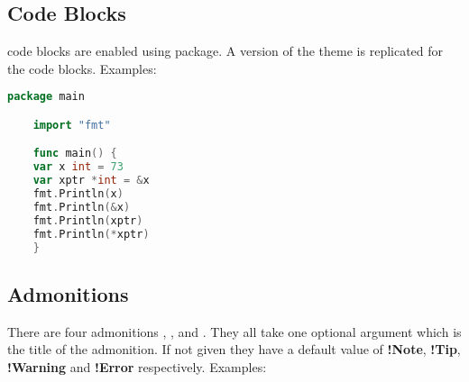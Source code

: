 \documentclass[12pt,a4paper]{report}
\begin{document}
\subsection{Code Blocks}
code blocks are enabled using  package. A version of the  theme is replicated for the code blocks. Examples:

\noindent
\begin{lstlisting}[language=go, caption={Code block caption},label=myCodeLabel]
	package main

	import "fmt"

	func main() {
	var x int = 73
	var xptr *int = &x
	fmt.Println(x)
	fmt.Println(&x)
	fmt.Println(xptr)
	fmt.Println(*xptr)
	}
\end{lstlisting}

\subsection{Admonitions}
There are four admonitions , ,  and . They all take one optional argument which is the title of the admonition. If not given they have a default value of \textbf{!Note}, \textbf{!Tip}, \textbf{!Warning} and \textbf{!Error} respectively. Examples:\\
\end{document}
